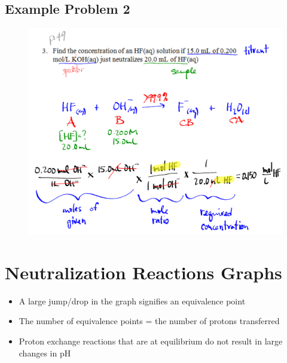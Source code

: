 \documentclass[a4paper,12pt]{article}
\begin{document}
\subsection{Example Problem 2}
\begin{figure}[H]
    \includegraphics[width=\textwidth]{equivex}
\end{figure}


\section{Neutralization Reactions Graphs}
\begin{itemize}
    \item{A large jump/drop in the graph signifies an equivalence point}
    \item{The number of equivalence points = the number of protons transferred}
    \item{Proton exchange reactions that are at equilibrium do not result in large changes in pH}
\end{itemize}
\end{document}
